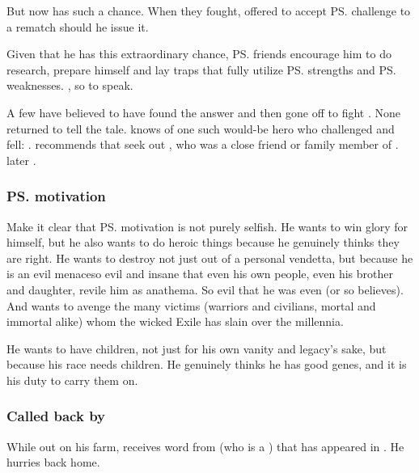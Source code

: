 But \Teshrial{} now has such a chance. 
When they fought, \Ishnaruchaefir{} {offered to accept \ps{\Teshrial} challenge to a rematch} should he issue it. 

Given that he has this extraordinary chance, \ps{\Teshrial} friends encourage him to do research, prepare himself and lay traps that fully utilize \ps{\Teshrial} strengths and \ps{\Ishnaruchaefir} weaknesses. 
, so to speak. 

A few have believed to have found the answer and then gone off to fight \Ishnaruchaefir{}. 
None returned to tell the tale. 
\Menessiaraid{} knows of one such would-be hero who challenged \Ishnaruchaefir{} and fell: 
. 
\Menessiaraid{} recommends that \Teshrial{} seek out , who was a close friend or family member of \Lothagiel. 
\Teshrial{} later . 





\subsubsection{\ps{\Teshrial} motivation}
Make it clear that \ps{\Teshrial} motivation is not purely selfish. 
He wants to win glory for himself, but he also wants to do heroic things because he genuinely thinks they are right. 
He wants to destroy \Ishnaruchaefir{} not just out of a personal vendetta, but because he is an evil menace\dash so evil and insane that even his own people, even his brother and daughter, revile him as anathema. 
So evil that he was even  (or so \Teshrial{} believes). 
And \Teshrial{} wants to avenge the many victims (warriors and civilians, mortal and immortal alike) whom the wicked Exile has slain over the millennia. 

He wants to have children, not just for his own vanity and legacy's sake, but because his race needs children. 
He genuinely thinks he has good genes, and it is his duty to carry them on. 





\subsubsection{Called back by \Achsah}
While out on his farm, \Teshrial{} receives word from \Achsah{} (who is a ) that \Ishnaruchaefir{} has appeared in \Malcur. 
He hurries back home. 









